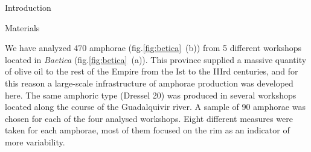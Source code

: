 \documentclass[final]{beamer}
\newcommand{\memo}[2]{\textcolor{#1}{#2}}
\newcommand{\xavi}[1]{\memo{orange}{#1\\}}
\newlength{\onecolwid}
\begin{document}
\begin{frame}[t]
\begin{columns}[t]
\begin{column}{\onecolwid}
\begin{block}{Introduction}

\end{block}

\vspace{-0.5cm}

\begin{block}{Materials}

\justify
We have analyzed 470 amphorae (fig.\ref{fig:betica}~(b)) from 5 different workshops located in \emph{Baetica} (fig.\ref{fig:betica}~(a)). This province supplied a massive quantity of olive oil to the rest of the Empire from the Ist to the IIIrd centuries, and for this reason a large-scale infrastructure of amphorae production was developed here. The same amphoric type (Dressel 20) was produced in several workshops located along the course of the Guadalquivir river. A sample of 90 amphorae was chosen for each of the four analysed workshops. Eight different measures were taken for each amphorae, most of them focused on the rim as an indicator of more variability. 



\begin{figure}
\begin{tabular}{cc}



\end{tabular}
\end{figure}
\end{block}
\end{column}
\end{columns}
\end{frame}
\end{document}
